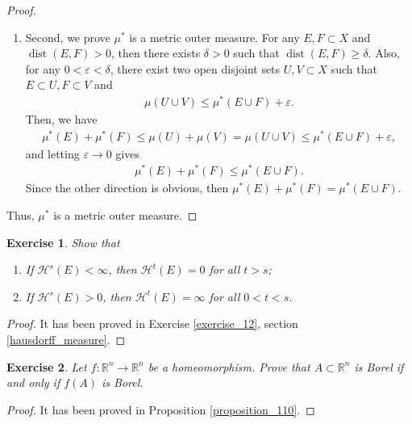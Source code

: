 \documentclass[11pt]{book}
\newtheorem{exercise}{Exercise}[chapter]
\theoremstyle{definition}
\numberwithin{equation}{chapter}
\def\H{{\mathcal H}}
\begin{document}
\begin{proof}
\begin{enumerate}[label=(\alph*)]
    \item Second, we prove $\mu^*$ is a metric outer measure. For any $E, F \subset X$ and $\operatorname{dist}(E,F) > 0$, then there exists $\delta > 0$ such that $\operatorname{dist}(E,F) \geq \delta$. Also, for any $0 < \varepsilon < \delta$, there exist two open disjoint sets $U, V \subset X$ such that $E \subset U, F \subset V$ and 
    \begin{align*}
        \mu(U \cup V) \leq \mu^*(E \cup F) + \varepsilon.
    \end{align*}
    Then, we have
    \begin{align*}
        \mu^*(E) + \mu^*(F) \leq \mu(U) + \mu(V) = \mu(U \cup V) \leq \mu^*(E \cup F) + \varepsilon,
    \end{align*}
    and letting $\varepsilon \to 0$ gives
    \begin{align*}
        \mu^*(E) + \mu^*(F) \leq \mu^*(E \cup F).
    \end{align*}
    Since the other direction is obvious, then $\mu^*(E) + \mu^*(F) = \mu^*(E \cup F)$.
\end{enumerate}
Thus, $\mu^*$ is a metric outer measure.
\end{proof}

\medskip

\begin{exercise}
Show that
\begin{enumerate}[label=(\alph*)]
    \item If $\H^s(E) < \infty$, then $\H^t(E) = 0$ for all $t > s$;
    \item If $\H^s(E) > 0$, then $\H^t(E) = \infty$ for all $0 < t < s$.
\end{enumerate}
\end{exercise}
\begin{proof}
It has been proved in Exercise \ref{exercise_12}, section \ref{hausdorff_measure}.
\end{proof}

\medskip

\begin{exercise}
Let $f:\mathbb{R}^n\to\mathbb{R}^n$ be a homeomorphism. Prove that $A\subset\mathbb{R}^n$ is Borel if and only if $f(A)$ is Borel.
\end{exercise}
\begin{proof}
It has been proved in Proposition \ref{proposition_110}.
\end{proof}

\medskip
\end{document}
